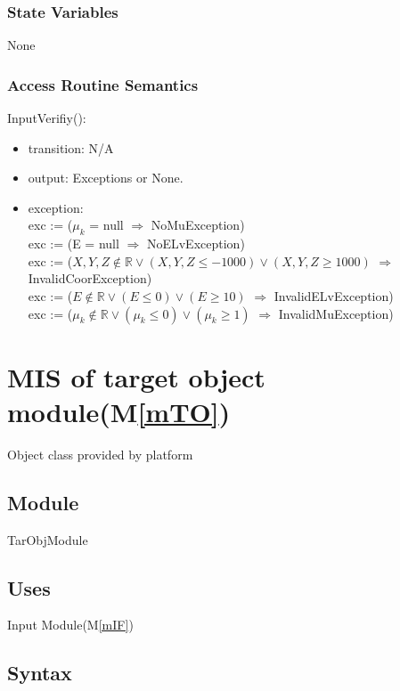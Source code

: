 \documentclass[12pt, titlepage]{article}
\newcommand{\mref}[1]{M\ref{#1}}
\begin{document}
\subsubsection{State Variables}
None
\subsubsection{Access Routine Semantics}

\noindent InputVerifiy():
\begin{itemize}
\item transition: N/A
\item output: Exceptions or None.
\item exception:\\
exc := ($\mu_{k}$ = null $\Rightarrow $ NoMuException)\\
exc := (E = null $\Rightarrow $ NoELvException)\\
exc := ($X,Y,Z \notin \mathbb{R} \vee (X,Y,Z \le -1000) \vee (X,Y,Z \ge 1000)$ $\Rightarrow $ InvalidCoorException)\\
exc := ($E \notin \mathbb{R} \vee (E \leq 0) \vee (E \geq 10)$ $\Rightarrow $ InvalidELvException)\\
exc := ($\mu_{k} \notin \mathbb{R} \vee (\mu_{k} \le 0) \vee (\mu_{k} \ge 1)$ $\Rightarrow $ InvalidMuException)\\
\end{itemize}

\section{MIS of target object module(\mref{mTO})}

Object class provided by platform

\subsection{Module}

TarObjModule

\subsection{Uses}

Input Module(\mref{mIF})

\subsection{Syntax}
\end{document}
